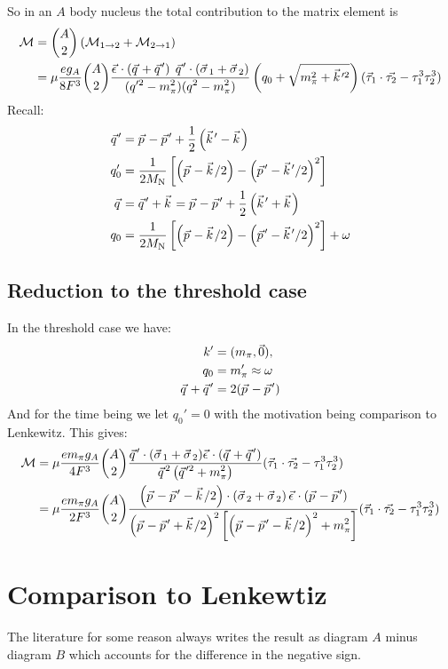 \documentclass[11pt]{article}
\newcommand\ddfrac[2]{\frac{\displaystyle #1}{\displaystyle #2}}
\newcommand{\vectorwithspace}[1]{\vec{#1}\mkern2mu\vphantom{#1}}
\newcommand{\kv}{\vectorwithspace{k}}
\newcommand{\pv}{\vectorwithspace{p}}
\newcommand{\qv}{\vectorwithspace{q}}
\newcommand{\sigv}{\vectorwithspace{\sigma}}
\newcommand{\epsv}{\vectorwithspace{\epsilon}}
\newcommand{\mpi}{\ensuremath{m_\pi}}
\newcommand{\ga}{\ensuremath{g_A}}
\newcommand{\MN}{\ensuremath{M_\mathrm{N}}} %
\newcommand{\calM}{\mathcal{M}} \newcommand{\calN}{\mathcal{N}}
\begin{document}
So in an $A$ body nucleus the total contribution to the matrix element is
\begin{align}
	\calM & =\binom{A}{2}\left( \calM_{1\to2} +\calM_{2\to1}\right) \\
	      & =\mu\frac{e\ga}{8 F^3}
	\binom{A}{2}
	\ddfrac{
		\epsv \cdot \left( \qv+\qv' \right)\;
		\qv' \cdot\left(  \sigv_1 +\sigv_2\right)
	}{
		(q'^2-\mpi^2)
		(q^2 -\mpi^2)
	}
	\left( q_0 + \sqrt{\mpi^2 +\kv'^2}\right)
	(\vec{\tau}_1 \cdot \vec{\tau_2} -\tau_1^3 \tau_2^3)
\end{align}
Recall:
\begin{align}
	\qv' & =\pv-\pv' + \frac{1}{2} \left( \kv'-\kv \right)                                               \\
	q_0' & =\frac{1}{2\MN}\left[ \left( \pv - \kv/2 \right)- \left( \pv' -\kv'/2 \right)^2\right]        \\
	\qv  & =\qv'+\kv=\pv-\pv' + \frac{1}{2} \left( \kv'+\kv \right)                                      \\
	q_0  & =\frac{1}{2\MN}\left[ \left( \pv - \kv/2 \right)- \left( \pv' -\kv'/2 \right)^2\right]+\omega
\end{align}
\subsection{Reduction to the threshold case}
In the threshold case we have:
\begin{align}
	k'       & =(\mpi,\vec{0}),    \\
	q_0      & =\mpi'\approx\omega \\
	\qv+\qv' & =  2(\pv-\pv')
\end{align}
And for the time being we let $q_0'=0$ with the motivation being comparison to Lenkewitz. This gives:
\begin{align}
	\calM & = \mu \frac{e \mpi \ga}{4 F^3} \binom{A}{2}
	\ddfrac{ \qv' \cdot(\sigv_1 +\sigv_2) \epsv \cdot \left( \qv+\qv' \right)
	}{
		\qv^2 \left( \qv'^2+\mpi^2 \right)
	}
	(\vec{\tau}_1 \cdot \vec{\tau_2} -\tau_1^3 \tau_2^3) \\
	      & =\mu \frac{e \mpi \ga}{2 F^3} \binom{A}{2}
	\ddfrac{
		\left(\pv-\pv'-\kv/2 \right) \cdot \left( \sigv_2 +\sigv_2 \right) \epsv \cdot \left( \pv -\pv' \right)
	}
	{
		\left( \pv -\pv' + \kv/2 \right)^2
		\left[\left(\pv -\pv' - \kv/2\right)^2 + \mpi^2\right]
	}
	(\vec{\tau}_1 \cdot \vec{\tau_2} -\tau_1^3 \tau_2^3)
\end{align}
\section{Comparison to Lenkewtiz}
The literature for some reason always writes the result as diagram $A$ minus diagram $B$ which accounts for the difference in the negative sign.
\end{document}
